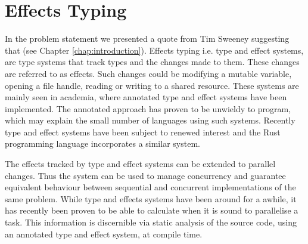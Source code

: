 \section{Effects Typing}
In the problem statement we presented a quote from Tim Sweeney suggesting that  (see Chapter \ref{chap:introduction}). Effects typing i.e. type and effect systems, are type systems that track types and the changes made to them\cite{nielson1999type}. These changes are referred to as effects. Such changes could be modifying a mutable variable, opening a file handle, reading or writing to a shared resource. These systems are mainly seen in academia, where annotated type and effect systems have been implemented. The annotated approach has proven to be unwieldy to program\needcite, which may explain the small number of languages using such systems. Recently type and effect systems have been subject to renewed interest and the Rust programming language incorporates a similar system\cite{rust:lang}.

The effects tracked by type and effect systems can be extended to parallel changes. Thus the system can be used to manage concurrency and guarantee equivalent behaviour between sequential and concurrent implementations of the same problem\cite{krogh2017relational}. While type and effects systems have been around for a awhile, it has recently been proven to be able to calculate when it is sound to parallelise a task\cite{birkedal2012concurrent}. This information is discernible via static analysis of the source code, using an annotated type and effect system, at compile time.
